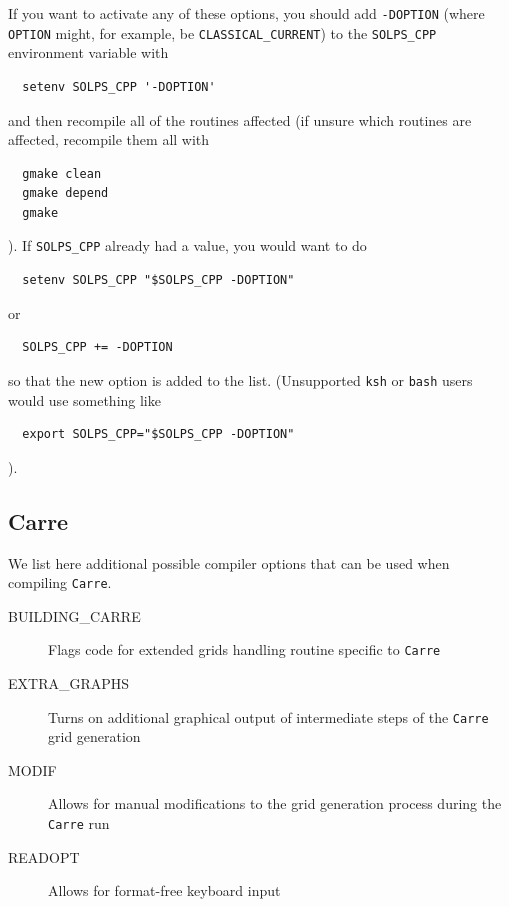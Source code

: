 \documentclass[a4paper,10pt]{report}
\begin{document}
If you want to activate any of these options, you should add
{\tt -DOPTION} (where {\tt OPTION} might, for example, be
{\tt CLASSICAL\_CURRENT}) to the {\tt SOLPS\_CPP} environment variable
with
\begin{verbatim}
  setenv SOLPS_CPP '-DOPTION'
\end{verbatim}
and then recompile all of the routines affected (if unsure which
routines are affected, recompile them all with
\begin{verbatim}
  gmake clean
  gmake depend
  gmake
\end{verbatim}
).  If {\tt SOLPS\_CPP} already had a value, you would want to do
\begin{verbatim}
  setenv SOLPS_CPP "$SOLPS_CPP -DOPTION"
\end{verbatim}
or
\begin{verbatim}
  SOLPS_CPP += -DOPTION
\end{verbatim}
so that the new option is added to the list. (Unsupported {\tt ksh}
or {\tt bash} users would use something like
\begin{verbatim}
  export SOLPS_CPP="$SOLPS_CPP -DOPTION"
\end{verbatim}
).

\subsection{Carre}


We list here additional possible compiler options that can be used when compiling {\tt Carre}.

\begin{description}
\item[BUILDING\_CARRE]  Flags code for extended grids handling routine specific to {\tt Carre}
\item[EXTRA\_GRAPHS]  Turns on additional graphical output of intermediate steps of the {\tt Carre} grid generation
\item[MODIF]  Allows for manual modifications to the grid generation process during the {\tt Carre} run
\item[READOPT]  Allows for format-free keyboard input
\end{description}

\end{document}
